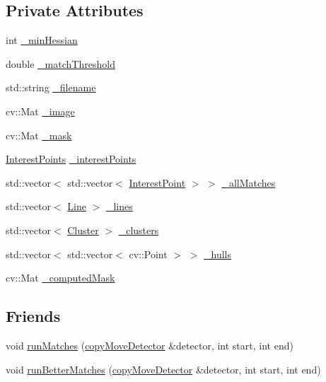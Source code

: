 \subsection*{Private Attributes}
\begin{DoxyCompactItemize}
\item 
int \hyperlink{classdefals_1_1copy_move_detector_a22c5159e48cc839ebd7959fd43f228d9}{\+\_\+min\+Hessian}
\item 
double \hyperlink{classdefals_1_1copy_move_detector_a800b15d314ae7f5cfea5d2d055af2bb1}{\+\_\+match\+Threshold}
\item 
std\+::string \hyperlink{classdefals_1_1copy_move_detector_aec9cb721f975705ca3074738420dae27}{\+\_\+filename}
\item 
cv\+::\+Mat \hyperlink{classdefals_1_1copy_move_detector_a87064ae3de9e131f78716bfc60c4ba15}{\+\_\+image}
\item 
cv\+::\+Mat \hyperlink{classdefals_1_1copy_move_detector_a4f87062f7eaeea1367e247e2115d776a}{\+\_\+mask}
\item 
\hyperlink{classdefals_1_1_interest_points}{Interest\+Points} \hyperlink{classdefals_1_1copy_move_detector_a6394341f692cf5c667da02689fbc2896}{\+\_\+interest\+Points}
\item 
std\+::vector$<$ std\+::vector$<$ \hyperlink{classdefals_1_1_interest_point}{Interest\+Point} $>$ $>$ \hyperlink{classdefals_1_1copy_move_detector_a766de41cc00644410659d3aafe1de3f9}{\+\_\+all\+Matches}
\item 
std\+::vector$<$ \hyperlink{classdefals_1_1_line}{Line} $>$ \hyperlink{classdefals_1_1copy_move_detector_acb0c13ded5ad341e55335e742e8f7bcf}{\+\_\+lines}
\item 
std\+::vector$<$ \hyperlink{namespacedefals_a93b34e2e4f989ac1ebef9f660cf3a303}{Cluster} $>$ \hyperlink{classdefals_1_1copy_move_detector_aee0bff9a68b697e1c6cc3efe98ba43ce}{\+\_\+clusters}
\item 
std\+::vector$<$ std\+::vector$<$ cv\+::\+Point $>$ $>$ \hyperlink{classdefals_1_1copy_move_detector_a02e4b53bac8ff8a2c0156021a734c41b}{\+\_\+hulls}
\item 
cv\+::\+Mat \hyperlink{classdefals_1_1copy_move_detector_a797a8057e5c825a699230bf65e468036}{\+\_\+computed\+Mask}
\end{DoxyCompactItemize}
\subsection*{Friends}
\begin{DoxyCompactItemize}
\item 
void \hyperlink{classdefals_1_1copy_move_detector_aa3e44592315f2f76400f306881b8abc7}{run\+Matches} (\hyperlink{classdefals_1_1copy_move_detector}{copy\+Move\+Detector} \&detector, int start, int end)
\item 
void \hyperlink{classdefals_1_1copy_move_detector_ad712afef89bfd0c3580ef63a6d197069}{run\+Better\+Matches} (\hyperlink{classdefals_1_1copy_move_detector}{copy\+Move\+Detector} \&detector, int start, int end)
\end{DoxyCompactItemize}


